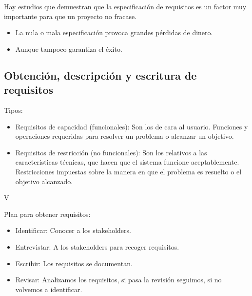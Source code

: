 \documentclass[12pt, twoside, openright]{report} %
\begin{document}
Hay estudios que demuestran que la especificación de requisitos es
un factor muy importante para que un proyecto no fracase.

\begin{itemize}

\item
	La nula o mala especificación provoca grandes pérdidas de dinero.
\item
	Aunque tampoco garantiza el éxito.
\end{itemize}

\subsection{Obtención, descripción y escritura de requisitos}

    Tipos:
    \begin{itemize}
		\item
		Requisitos de capacidad (funcionales): Son los de cara al usuario.
		Funciones y operaciones requeridas para resolver un problema o
		alcanzar un objetivo.
		\item
		Requisitos de restricción (no funcionales): Son los relativos a
		las características técnicas, que hacen que el sistema funcione
		aceptablemente. Restricciones impuestas sobre la manera en que el
		problema es resuelto o el objetivo alcanzado.
    \end{itemize}

	V
	\begin{figure}[H]
		{\def\svgwidth{.8\textwidth}
 		 }
	\end{figure}

	Plan para obtener requisitos:
    \begin{itemize}
		\item
		Identificar: Conocer a los stakeholders.
		\item
		Entrevistar: A los stakeholders para recoger requisitos.
		\item
		Escribir: Los requisitos se documentan.
		\item
		Revisar: Analizamos los requisitos, si pasa la revisión seguimos,
		si no volvemos a identificar.
    \end{itemize}
\end{document}

